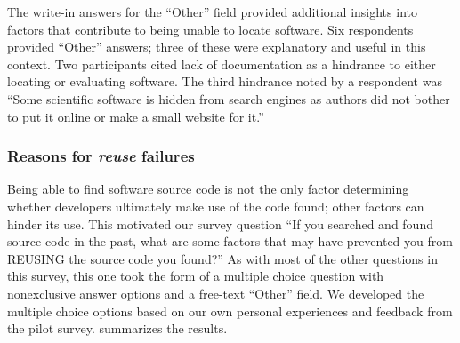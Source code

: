 \documentclass{casicswhitepaper}
\begin{document}
%

The write-in answers for the ``Other'' field provided additional insights into factors that contribute to being unable to locate software.  Six respondents provided ``Other'' answers; three of these were explanatory and useful in this context.  Two participants cited lack of documentation as a hindrance to either locating or evaluating software.  The third hindrance noted by a respondent was ``Some scientific software is hidden from search engines as authors did not bother to put it online or make a small website for it.''


\subsubsection{Reasons for \emph{reuse} failures}
\label{reuse-failures}

Being able to find software source code is not the only factor determining whether developers ultimately make use of the code found; other factors can hinder its use.  This motivated our survey question ``If you searched and found source code in the past, what are some factors that may have prevented you from REUSING the source code you found?''  As with most of the other questions in this survey, this one took the form of a multiple choice question with nonexclusive answer options and a free-text ``Other'' field.  We developed the multiple choice options based on our own personal experiences and feedback from the pilot survey.   summarizes the results.
\end{document}

